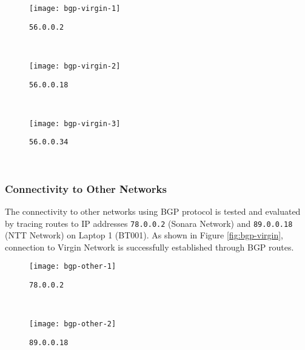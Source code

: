 \begin{figure*}[ht!]
    \centering
    \begin{subfigure}[b]{\textwidth}
        \centering
        \texttt{[image: bgp-virgin-1]}
        \caption{\texttt{56.0.0.2}}
    \end{subfigure}
    ~
    \begin{subfigure}[b]{\textwidth}
        \centering
        \texttt{[image: bgp-virgin-2]}
        \caption{\texttt{56.0.0.18}}
    \end{subfigure}
    ~
    \begin{subfigure}[b]{\textwidth}
        \centering
        \texttt{[image: bgp-virgin-3]}
        \caption{\texttt{56.0.0.34}}
    \end{subfigure}
    ~
    \caption{Tracing IPv4 Routes to Virgin Network on Laptop 1 (BT001) using \texttt{traceroute}.}
    \label{fig:bgp-virgin}
\end{figure*}



\clearpage


\subsubsection{Connectivity to Other Networks}
The connectivity to other networks using BGP protocol is tested and evaluated by tracing routes to IP addresses \texttt{78.0.0.2} (Sonara Network) and \texttt{89.0.0.18} (NTT Network) on Laptop 1 (BT001). As shown in Figure \ref{fig:bgp-virgin}, connection to Virgin Network is successfully established through BGP routes.

\begin{figure*}[ht!]
    \centering
    \begin{subfigure}[b]{\textwidth}
        \centering
        \texttt{[image: bgp-other-1]}
        \caption{\texttt{78.0.0.2}}
    \end{subfigure}
    ~
    \begin{subfigure}[b]{\textwidth}
        \centering
        \texttt{[image: bgp-other-2]}
        \caption{\texttt{89.0.0.18}}
    \end{subfigure}
    \caption{Tracing IPv4 Routes to Other Networks on Laptop 1 (BT001) using \texttt{traceroute}.}
    \label{fig:bgp-virgin}
\end{figure*}



\clearpage

